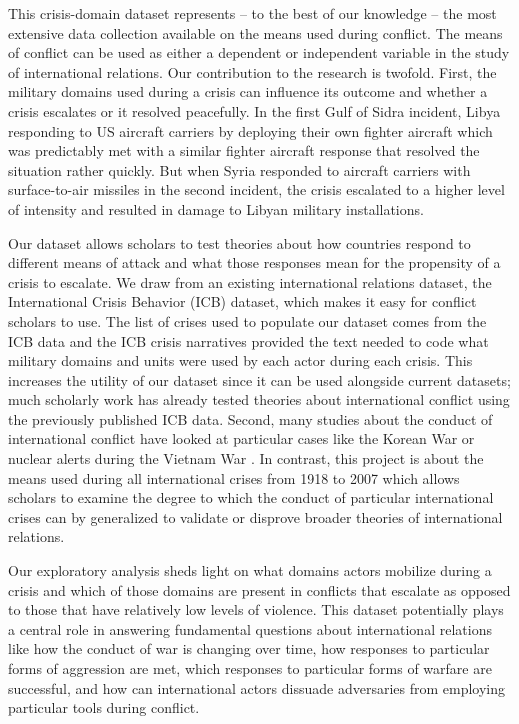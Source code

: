 \documentclass[12pt,letterpaper]{article}
\begin{document}
		This crisis-domain dataset represents -- to the best of our knowledge --  the most extensive data collection available on the means used during conflict. The means of conflict can be used as either a dependent or independent variable in the study of international relations. Our contribution to the research is twofold. First, the military domains used during a crisis can influence its outcome and whether a crisis escalates or it resolved peacefully. In the first Gulf of Sidra incident, Libya responding to US aircraft carriers by deploying their own fighter aircraft which was predictably met with a similar fighter aircraft response that resolved the situation rather quickly. But when Syria responded to aircraft carriers with surface-to-air missiles in the second incident, the crisis escalated to a higher level of intensity and resulted in damage to Libyan military installations.
		
		Our dataset allows scholars to test theories about how countries respond to different means of attack and what those responses mean for the propensity of a crisis to escalate. We draw from an existing international relations dataset, the International Crisis Behavior (ICB) dataset, which makes it easy for conflict scholars to use. The list of crises used to populate our dataset comes from the ICB data and the ICB crisis narratives provided the text needed to code what military domains and units were used by each actor during each crisis. This increases the utility of our dataset since it can be used alongside current datasets; much scholarly work has already tested theories about international conflict using the previously published ICB data. Second, many studies about the conduct of international conflict have looked at particular cases like the Korean War \citep{slantchev_feigningweakness_2010} or nuclear alerts during the Vietnam War \citep{sagan_madmannuclearalert_2003}. In contrast, this project is about the means used during all international crises from 1918 to 2007 which allows scholars to examine the degree to which the conduct of particular international crises can by generalized to validate or disprove broader theories of international relations.
		
		Our exploratory analysis sheds light on what domains actors mobilize during a crisis and which of those domains are present in conflicts that escalate as opposed to those that have relatively low levels of violence. This dataset potentially plays a central role in answering fundamental questions about international relations like how the conduct of war is changing over time, how responses to particular forms of aggression are met, which responses to particular forms of warfare are successful, and how can international actors dissuade adversaries from employing particular tools during conflict.
\end{document}
